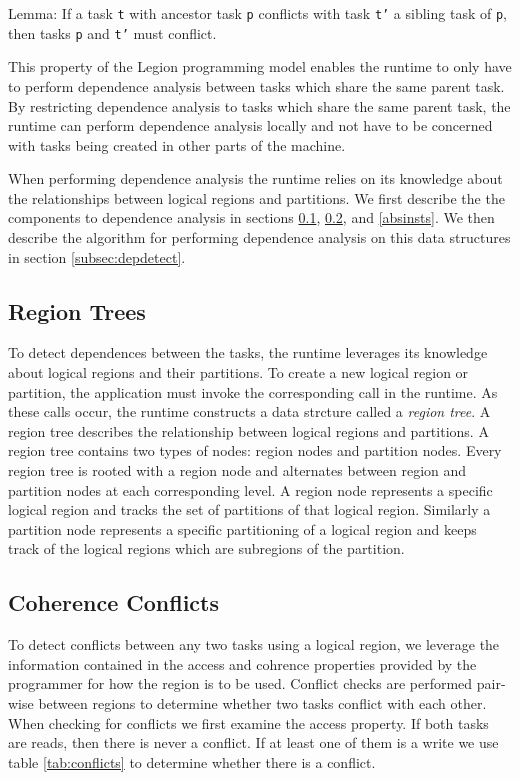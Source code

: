 Lemma: If a task {\tt t} with ancestor task {\tt p} conflicts with task {\tt t'}
a sibling task of {\tt p}, then tasks {\tt p} and {\tt t'} must conflict.

This property of the Legion programming model enables the runtime to only 
have to perform dependence analysis between tasks which share the same 
parent task.  By restricting dependence analysis to tasks which share the same
parent task, the runtime can perform dependence analysis locally and not
have to be concerned with tasks being created in other parts of the machine.

When performing dependence analysis the runtime relies on its knowledge about
the relationships between logical regions and partitions.  We first describe
the the components to dependence analysis in sections \ref{subsec:regiontree},
\ref{subsec:cohconf}, and \ref{absinsts}.  We then describe the algorithm for performing 
dependence analysis on this data structures in section \ref{subsec:depdetect}.

\subsection{Region Trees}
\label{subsec:regiontree}
To detect dependences between the tasks, the runtime leverages its knowledge
about logical regions and their partitions.  To create a new logical region
or partition, the application must invoke the corresponding call in the
runtime.  As these calls occur, the runtime constructs a data strcture
called a {\em region tree}.  A region tree describes the relationship between
logical regions and partitions.  A region tree contains two types of nodes:
region nodes and partition nodes.  Every region tree is rooted with a region
node and alternates between region and partition nodes at each corresponding level.
A region node represents a specific logical region and tracks the set of
partitions of that logical region.  Similarly a partition node represents 
a specific partitioning of a logical region and keeps track of the logical regions 
which are subregions of the partition.  

\subsection{Coherence Conflicts}
\label{subsec:cohconf}
To detect conflicts between any two tasks using a logical region, we leverage
the information contained in the access and cohrence properties provided by the programmer
for how the region is to be used.  Conflict checks are performed pair-wise between regions
to determine whether two tasks conflict with each other.  When checking for
conflicts we first examine the access property.  If both tasks are reads, then 
there is never a conflict.  If at least one of them is a write we use table
\ref{tab:conflicts} to determine whether there is a conflict.

